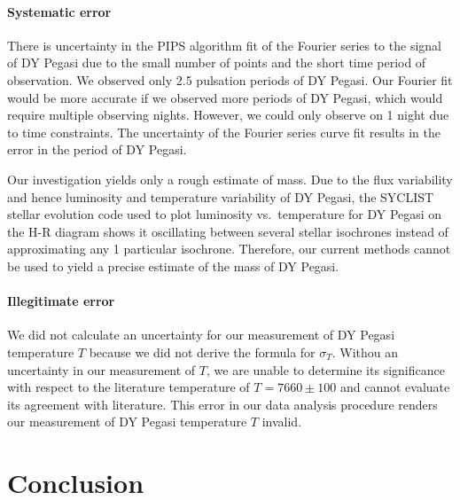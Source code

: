 \documentclass[twocolumn]{aastex631}
\begin{document}
\paragraph{Systematic error} There is uncertainty in the PIPS algorithm fit of the Fourier series to the signal of DY Pegasi due to the small number of points and the short time period of observation. We observed only 2.5 pulsation periods of DY Pegasi. Our Fourier fit would be more accurate if we observed more periods of DY Pegasi, which would require multiple observing nights. However, we could only observe on 1 night due to time constraints. The uncertainty of the Fourier series curve fit results in the error in the period of DY Pegasi.

Our investigation yields only a rough estimate of mass. Due to the flux variability and hence luminosity and temperature variability of DY Pegasi, the SYCLIST stellar evolution code used to plot luminosity vs.\ temperature for DY Pegasi on the H-R diagram shows it oscillating between several stellar isochrones instead of approximating any 1 particular isochrone. Therefore, our current methods cannot be used to yield a precise estimate of the mass of DY Pegasi.

\paragraph{Illegitimate error} We did not calculate an uncertainty for our measurement of DY Pegasi temperature $T$ because we did not derive the formula for $\sigma_T$. Withou an uncertainty in our measurement of $T$, we are unable to determine its significance with respect to the literature temperature of $T = 7660 \pm 100$ \citep{Hintz_2004} and cannot evaluate its agreement with literature. This error in our data analysis procedure renders our measurement of DY Pegasi temperature $T$ invalid.


\section{Conclusion} \label{sec:conclusion} %
\end{document}
